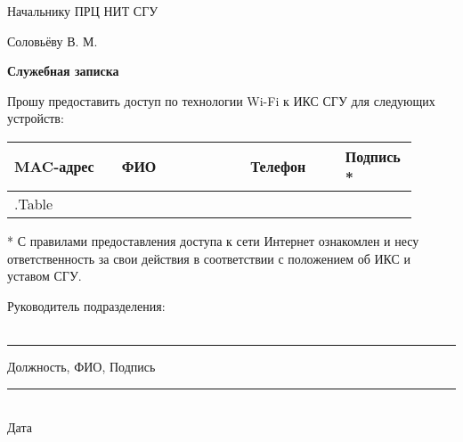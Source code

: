 \documentclass[12pt]{article}
\begin{document}
\begin{flushright}
Начальнику ПРЦ НИТ СГУ

Соловьёву В. М. \\[50pt]
\end{flushright}

\begin{center}
\large
\textbf{Служебная записка} \\[20pt]
\end{center}
\begin{flushleft}
\large
Прошу предоставить доступ по технологии Wi-Fi к ИКС СГУ для следующих устройств:
\end{flushleft}




\begin{table}[!h]
\large
\centering
\label{my-label}
\begin{tabular}{|p{0.25\linewidth}|p{0.3\linewidth}|p{0.22\linewidth}|p{0.135\linewidth}|}
\hline
MAC-адрес & ФИО & Телефон & Подпись *  \\
\hline
{{.Table}}
\end{tabular}
\end{table}


\small
* С правилами предоставления доступа к сети Интернет ознакомлен и несу ответственность за свои действия в соответствии с положением об ИКС и уставом СГУ. \\[30pt]

\normalsize
\begin{flushleft}
\large
Руководитель подразделения:\\~\\
\end{flushleft}
\centering
\noindent\rule{550pt}{0.4pt}
\large
Должность, ФИО, Подпись\\[50pt]

\begin{flushright}
\normalsize
  \noindent\rule{100pt}{0.4pt} \\
  Дата           
\end{flushright}
\end{document}
